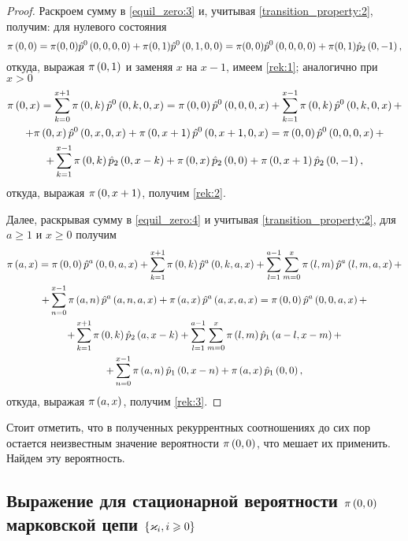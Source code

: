 \documentclass[a4paper,14pt,russian]{article}
\newcommand{\Markk}[0]{\brrr{ \vk_i, i \geqslant 0}}
\newcommand{\p}{\hat{p}}
\begin{document}
\begin{proof}
Раскроем сумму в \eqref{equil_zero:3} и, учитывая \eqref{transition_property:2}, получим: для нулевого состояния
\begin{equation*}
 \pi\br{0,0} = \pi(0,0) \p^0\br{0,0,0,0} + \pi(0,1) \p^0\br{0,1,0,0} = \pi(0,0) \p^0\br{0,0,0,0} + \pi(0,1) \hat{p}_2\br{0,-1},
\end{equation*}
откуда, выражая $ \pi\left(0,1\right)$ и заменяя $x$ на $x-1$, имеем \eqref{rek:1}; аналогично при $x>0$
\begin{multline*}
 \pi\br{0,x} = \sum_{k=0}^{x+1} \pi\br{0,k}\p^0\br{0,k,0,x} =\pi\br{0,0}\p^0\br{0,0,0,x} + \sum_{k=1}^{x-1}\pi\br{0,k}\p^0\br{0,k,0,x}+\\
 +\pi\br{0,x}\p^0\br{0,x,0,x} + \pi\br{0,x+1}\p^0\br{0,x+1,0,x} =\pi\br{0,0}\p^0\br{0,0,0,x} +\\
 +\sum_{k=1}^{x-1}\pi\br{0,k}\p_2\br{0,x-k} + \pi\br{0,x}\p_2\br{0,0} + \pi\br{0,x+1}\p_2\br{0,-1},
\end{multline*}
откуда, выражая $\pi\left(0,x+1\right)$, получим \eqref{rek:2}.

Далее, раскрывая сумму в \eqref{equil_zero:4} и учитывая \eqref{transition_property:2}, для $a \geqslant 1$ и $x \geqslant 0$ получим
\begin{multline*}
 \pi\br{a,x} = \pi\br{0, 0} \p^a\br{0,0,a,x} + \sum_{k=1}^{x+1} \pi\br{0, k} \p^a\br{0,k,a,x} + 
 \sum_{l=1}^{a-1} \sum_{m=0}^{x}\pi\br{l,m} \p^a\br{l,m,a,x} +\\
+ \sum_{n=0}^{x-1}\pi\br{a,n}\p^a\br{a,n,a,x} +  \pi\br{a,x}\p^a\br{a,x,a,x} =
\pi\br{0, 0} \p^a\br{0,0,a,x} + \\+
\sum_{k=1}^{x+1} \pi\br{0, k} \p_2\br{a, x-k} + 
 \sum_{l=1}^{a-1} \sum_{m=0}^{x}\pi\br{l,m} \p_1\br{a-l,x-m} +\\
+ \sum_{n=0}^{x-1}\pi\br{a,n}\p_1\br{0,x-n} +  \pi\br{a,x}\p_1\br{0,0},
\end{multline*}
откуда, выражая $\pi\left(a,x\right)$, получим \eqref{rek:3}.
\end{proof}
Стоит отметить, что в полученных рекуррентных соотношениях до сих пор остается неизвестным значение вероятности $\pi\left(0,0\right)$, что мешает их
применить. Найдем эту вероятность.

\subsection{Выражение для стационарной вероятности $\pi\left(0,0\right)$ марковской цепи $\Markk$}
\end{document}
